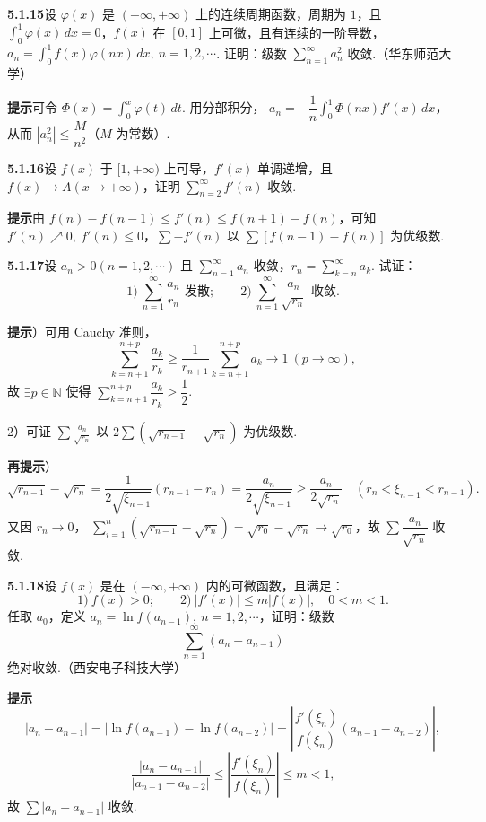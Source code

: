 \documentclass[UTF8,12pt,a4paper,fontset=fandol]{ctexart}
\begin{document}
\noindent\textbf{5.1.15}\quad 设 $\varphi(x)$ 是 $(-\infty,+\infty)$ 上的连续周期函数，周期为 $1$，且
$\displaystyle\int_0^1\varphi(x)\,dx=0$，$f(x)$ 在 $[0,1]$ 上可微，且有连续的一阶导数，
$a_n=\displaystyle\int_0^1f(x)\varphi(nx)\,dx,\ n=1,2,\cdots$. 证明：级数
$\displaystyle\sum_{n=1}^{\infty}a_n^2$ 收敛.（华东师范大学）

\noindent\textbf{提示}\quad 可令 $\Phi(x)=\displaystyle\int_0^x\varphi(t)\,dt$. 用分部积分，
$a_n=-\dfrac1n\displaystyle\int_0^1\Phi(nx)f'(x)\,dx$，从而
$|a_n^2|\le\dfrac{M}{n^2}$（$M$ 为常数）.

\noindent\textbf{5.1.16}\quad 设 $f(x)$ 于 $[1,+\infty)$ 上可导，$f'(x)$ 单调递增，且
$f(x)\to A(x\to+\infty)$，证明 $\displaystyle\sum_{n=2}^{\infty}f'(n)$ 收敛.

\noindent\textbf{提示}\quad 由 $f(n)-f(n-1)\le f'(n)\le f(n+1)-f(n)$，可知
$f'(n)\nearrow0,\ f'(n)\le0$，$\sum-f'(n)$ 以 $\sum[f(n-1)-f(n)]$ 为优级数.

\noindent\textbf{5.1.17}\quad 设 $a_n>0(n=1,2,\cdots)$ 且
$\displaystyle\sum_{n=1}^{\infty}a_n$ 收敛，$r_n=\displaystyle\sum_{k=n}^{\infty}a_k$. 试证：
\[
  1)\ \sum_{n=1}^{\infty}\frac{a_n}{r_n}\text{ 发散};\qquad
  2)\ \sum_{n=1}^{\infty}\frac{a_n}{\sqrt{r_n}}\text{ 收敛}.
\]

\noindent\textbf{提示}）可用 Cauchy 准则，
\[
  \sum_{k=n+1}^{n+p}\frac{a_k}{r_k}
  \ge \frac1{r_{n+1}}\sum_{k=n+1}^{n+p}a_k\to1\ (p\to\infty),
\]
故 $\exists p\in\mathbb N$ 使得 $\displaystyle\sum_{k=n+1}^{n+p}\dfrac{a_k}{r_k}\ge\dfrac12$.

2）可证 $\displaystyle\sum\frac{a_n}{\sqrt{r_n}}$ 以
$2\sum(\sqrt{r_{n-1}}-\sqrt{r_n})$ 为优级数.

\noindent\textbf{再提示}）
\[
  \sqrt{r_{n-1}}-\sqrt{r_n}
  =\frac1{2\sqrt{\xi_{n-1}}}(r_{n-1}-r_n)
  =\frac{a_n}{2\sqrt{\xi_{n-1}}}\ge\frac{a_n}{2\sqrt{r_n}}
  \quad(r_n<\xi_{n-1}<r_{n-1}).
\]
又因 $r_n\to0$，
$\sum_{i=1}^n(\sqrt{r_{n-1}}-\sqrt{r_n})=\sqrt{r_0}-\sqrt{r_n}\to\sqrt{r_0}$，故
$\sum\dfrac{a_n}{\sqrt{r_n}}$ 收敛.

\noindent\textbf{5.1.18}\quad 设 $f(x)$ 是在 $(-\infty,+\infty)$ 内的可微函数，且满足：
\[
  1)\ f(x)>0;\qquad 2)\ |f'(x)|\le m|f(x)|,\quad 0<m<1.
\]
任取 $a_0$，定义 $a_n=\ln f(a_{n-1}),\ n=1,2,\cdots$，证明：级数
\[
  \sum_{n=1}^{\infty}(a_n-a_{n-1})
\]
绝对收敛.（西安电子科技大学）

\noindent\textbf{提示}\quad
\[
  |a_n-a_{n-1}|
  =|\ln f(a_{n-1})-\ln f(a_{n-2})|
  =\left|\frac{f'(\xi_n)}{f(\xi_n)}(a_{n-1}-a_{n-2})\right|,
\]
\[
  \frac{|a_n-a_{n-1}|}{|a_{n-1}-a_{n-2}|}
  \le \left|\frac{f'(\xi_n)}{f(\xi_n)}\right|\le m<1,
\]
故 $\sum|a_n-a_{n-1}|$ 收敛.
\end{document}
